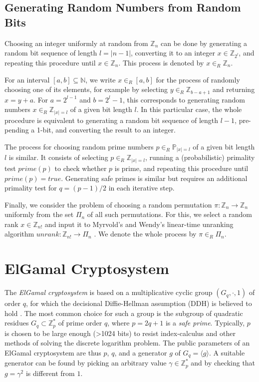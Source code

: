 \documentclass[bibtotoc,halfparskip,oneside]{scrreprt}
\begin{document}
\subsection{Generating Random Numbers from Random Bits}
Choosing an integer uniformly at random from $\mathbb{Z}_n$ can be done by generating a random bit sequence of length  $l=|n-1|$, converting it to an integer $x\in\mathbb{Z}_{2^l}$, and repeating this procedure until $x\in\mathbb{Z}_n$. This process is denoted by $x\in_R\mathbb{Z}_n$. 

For an interval $[a,b]\subseteq \mathbb{N}$, we write $x\in_R[a,b]$ for the process of randomly choosing one of its elements, for example by selecting $y\in_R\mathbb{Z}_{b-a+1}$ and returning $x=y+a$. For $a=2^{l-1}$ and $b=2^l-1$, this corresponds to generating random numbers $x\in_R\mathbb{Z}_{|x|=l}$ of a given bit length $l$. In this particular case, the whole procedure is equivalent to generating a random bit sequence of length $l-1$, pre-pending a 1-bit, and converting the result to an integer.

The process for choosing random prime numbers $p\in_R\mathbb{P}_{|x|=l}$ of a given bit length $l$ is similar. It consists of selecting $p\in_R\mathbb{Z}_{|x|=l}$, running a (probabilistic) primality test $\mathit{prime}(p)$ to check whether $p$ is prime, and repeating this procedure until $\mathit{prime}(p)=\mathit{true}$. Generating safe primes is similar but requires an additional primality test for $q=(p-1)/2$ in each iterative step.

Finally, we consider the problem of choosing a random permutation $\pi:\mathbb{Z}_n\rightarrow\mathbb{Z}_n$ uniformly from the set $\Pi_n$ of all such permutations. For this, we select a random rank $x\in \mathbb{Z}_{n!}$ and input it to Myrvold's and Wendy's linear-time unranking algorithm $\mathit{unrank}:\mathbb{Z}_{n!}\rightarrow\Pi_n$ \cite{MR01}. We denote the whole process by $\pi\in_R\Pi_n$.

\section{ElGamal Cryptosystem} 

The \emph{ElGamal cryptosystem} is based on a multiplicative cyclic group $(G_q,\cdot,1)$ of order $q$, for which the decisional Diffie-Hellman assumption (DDH) is believed to hold \cite{gamal84}. The most common choice for such a group is the subgroup of quadratic residues $G_q\subset\mathbb{Z}_p^*$ of prime order $q$, where $p=2q+1$ is a \emph{safe prime}. Typically, $p$ is chosen to be large enough (>1024 bits) to resist index-calculus and other methods of solving the discrete logarithm problem. The public parameters of an ElGamal cryptosystem are thus $p$, $q$, and a generator $g$ of $G_q=\langle g\rangle$. A suitable generator can be found by picking an arbitrary value $\gamma\in\mathbb{Z}_p^*$ and by checking that $g=\gamma^2$ is different from $1$.
\end{document}
